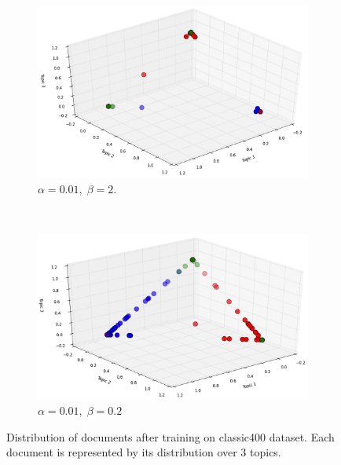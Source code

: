 \documentclass[twoside,12pt]{article}
\begin{document}
\begin{figure}[h!]
        \begin{subfigure}[b]{0.5\textwidth}
                \includegraphics[width=\textwidth]{figs/classicalpha001beta2.png}
                \caption{$\alpha=0.01,\;\beta=2.$}
                \label{fig:mouse}
        \end{subfigure}%
        ~ %
                  \begin{subfigure}[b]{0.5\textwidth}
                \includegraphics[width=\textwidth]{figs/classicalpha001beta02.png}
                \caption{$\alpha=0.01,\;\beta=0.2$}
                \label{fig:mouse}
        \end{subfigure}
        \caption{Distribution of documents after training on classic400 dataset. Each document is represented by its distribution over 3 topics.}
        \label{figClassicDist}
\end{figure}
\end{document}
